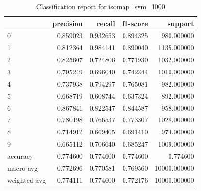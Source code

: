 \begin{table}[htb!]
    \centering
    \begin{tabular}{lrrrr}
        \toprule
        & precision & recall & f1-score & support \\
        \midrule
        0 & 0.859023 & 0.932653 & 0.894325 & 980.000000 \\
        1 & 0.812364 & 0.984141 & 0.890040 & 1135.000000 \\
        2 & 0.825607 & 0.724806 & 0.771930 & 1032.000000 \\
        3 & 0.795249 & 0.696040 & 0.742344 & 1010.000000 \\
        4 & 0.737938 & 0.794297 & 0.765081 & 982.000000 \\
        5 & 0.668719 & 0.608744 & 0.637324 & 892.000000 \\
        6 & 0.867841 & 0.822547 & 0.844587 & 958.000000 \\
        7 & 0.780198 & 0.766537 & 0.773307 & 1028.000000 \\
        8 & 0.714912 & 0.669405 & 0.691410 & 974.000000 \\
        9 & 0.665112 & 0.706640 & 0.685247 & 1009.000000 \\
        accuracy & 0.774600 & 0.774600 & 0.774600 & 0.774600 \\
        macro avg & 0.772696 & 0.770581 & 0.769560 & 10000.000000 \\
        weighted avg & 0.774111 & 0.774600 & 0.772176 & 10000.000000 \\
        \bottomrule
        \end{tabular}
        \caption{Classification report for isomap\_svm\_1000}
        \label{tab:classification-report-isomap_svm_1000}
        \end{table}


